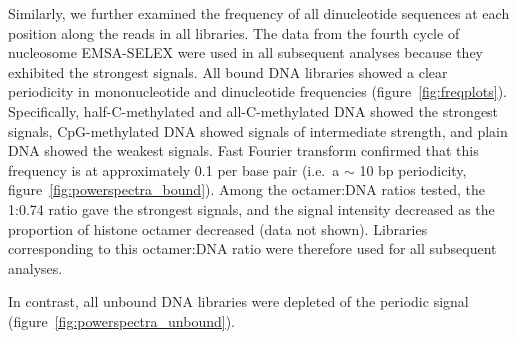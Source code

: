 \documentclass[a4paper, numbers=noenddot]{scrbook}
\begin{document}
Similarly, we further examined the frequency of all dinucleotide sequences at each position along the reads in all libraries.  The data from the fourth cycle of nucleosome EMSA-SELEX were used in all subsequent analyses because they exhibited the strongest signals.  All bound DNA libraries showed a clear periodicity in mononucleotide and dinucleotide frequencies (figure~\ref{fig:freqplots}).  Specifically, half-C-methylated and all-C-methylated DNA showed the strongest signals, CpG-methylated DNA showed signals of intermediate strength, and plain DNA showed the weakest signals.  Fast Fourier transform confirmed that this frequency is at approximately 0.1 per base pair (i.e.\ a $\sim$ 10 bp periodicity, figure~\ref{fig:powerspectra_bound}).  Among the octamer:DNA ratios tested, the 1:0.74 ratio gave the strongest signals, and the signal intensity decreased as the proportion of histone octamer decreased (data not shown).  Libraries corresponding to this octamer:DNA ratio were therefore used for all subsequent analyses.

In contrast, all unbound DNA libraries were depleted of the periodic signal (figure~\ref{fig:powerspectra_unbound}).
\end{document}
